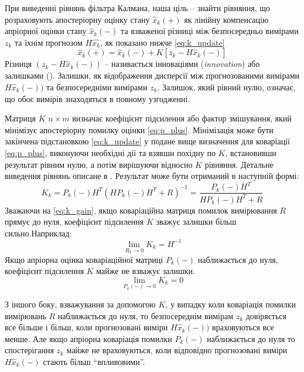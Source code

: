 При виведенні рівнянь фільтра Калмана, наша ціль -- знайти рівняння, що 
розраховують апостеріорну оцінку стану $\hat{x}_{k}(+)$ як лінійну компенсацію
апріорної оцінки стану $\hat{x}_{k}(-)$ та взваженої різниці між безпосередньо
вимірами $z_{k}$ та їхнім прогнозом $H\hat{x_{k}}$, як показано нижче \eqref{eq:k_update}
\begin{equation}
  \label{eq:k_update}
 \hat{x}_{k}(+)= \hat{x}_{k}(-) + K\left[z_{k}-H\hat{x}_{k}(-)\right]
\end{equation}
Різниця $(z_{k}-H\hat{x}_{k}(-))$  -- називається інноваціями (\textit{innovation}) 
або залишками (). Залишки, як відображення дисперсії між прогнозованими
вимірами $H\hat{x}_{k}(-))$ та безпосередніми вимірами $z_{k}$. Залишок, який
рівний нулю, означає, що обоє вимірів знаходяться в повному узгодженні.

Матриця $K$ $n \times m$ визначає коефіцієнт підсилення або фактор
змішування, який мінімізує апостеріорну помилку оцінки \eqref{eq:p_plus}.
Мінімізація може бути закінчена підстановкою \eqref{eq:k_update} у подане 
вище визначення для коваріації \eqref{eq:p_plus}, виконуючи необхідні дії та
взявши похідну по $K$, встановивши результат рівним нулю, а потім
вирішуючи відносно $K$ рівняння. Детальне виведення рівнянь описане в \cite{bib:gps_ins}.
Результат може бути отриманий в наступній формі:
\begin{equation}
  \label{eq:k_gain}
  K_{k}=P_{k}(-)H^{T}(HP_{k}(-)H^{T}+R)^{-1} = \frac{P_{k}(-)H^{T}}{HP_{k}(-)H^{T}+R} 
\end{equation}
Зважаючи на \eqref{eq:k_gain}, якщо коваріаційна матриця помилок вимірювання
$R$ прямує до нуля, коефіцієнт підсилення $K$ зважує залишки 
більш сильно.Наприклад:
\begin{equation}
  \label{eq:lim_R}
  \displaystyle\lim_{R_{k}\to 0} K_{k} = H^{-1}
\end{equation}
Якщо апріорна оцінка коваріаційної матриці $P_{k}(-)$ наближається
до нуля, коефіцієнт підсилення $K$ майже не взважує залишки.
\begin{equation}
  \label{eq:lim_P_minus}
  \displaystyle\lim_{P_{k}(-)\to 0} K_{k} = 0
\end{equation}

З іншого боку, взважування за допомогою $K$, у випадку коли коваріація 
помилки вимірювань $R$ наближається до нуля, то безпосереднім вимірам
$z_{k}$ довіряється все більше і більш, коли прогнозовані виміри $H\hat{x}_{k}(-))$
враховуються все менше. Але якщо апріорна коваріація помилки $P_{k}(-)$ наближається
до нуля то спостерігання $z_{k}$ майже не враховуються, коли відповідно
прогнозовані виміри $H\hat{x}_{k}(-)$ стають більш ``впливовими''.

